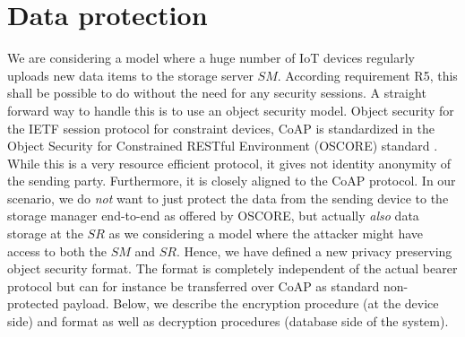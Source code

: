 {\section{Data protection}
\label{dataprotection}
We are considering a model where a huge number of IoT devices regularly uploads new data items to the storage server $SM$. According requirement R5, this shall be possible to do without the need for any security sessions. A straight forward way to handle this is to use an object security model. Object security for the IETF session protocol for constraint devices, CoAP \cite{rfc7252} is standardized in the Object Security for Constrained RESTful Environment (OSCORE) standard \cite{RFC8613}. While this is a very resource efficient protocol, it gives not identity anonymity of the sending party. Furthermore, it is closely aligned to the CoAP protocol. In our scenario, we do \emph{not} want to just protect the data from the sending device to the storage manager end-to-end as offered by OSCORE, but actually \emph{also} data storage at the $SR$ as we considering a model where the attacker might have access to both the $SM$ and $SR$. Hence, we have defined a new privacy preserving object security format. The format is completely independent of the actual bearer protocol but can for instance be transferred over CoAP as standard non-protected payload. Below, we describe the encryption procedure (at the device side) and format as well as decryption procedures (database side of the system).

}
